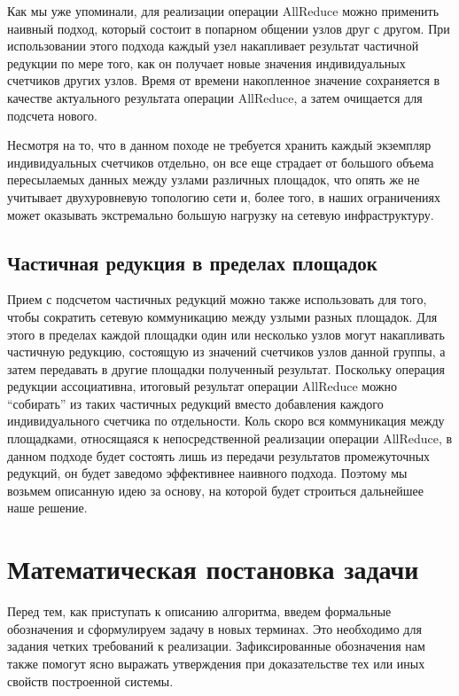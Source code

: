 \documentclass{article}
\theoremstyle{plain}
\theoremstyle{plain}
\theoremstyle{plain}
\theoremstyle{plain}
\theoremstyle{definition}
\theoremstyle{remark}
\theoremstyle{plain}
\begin{document}
Как мы уже упоминали, для реализации операции AllReduce можно применить наивный подход, который состоит в попарном общении узлов друг с другом. При использовании этого подхода каждый узел накапливает результат частичной редукции по мере того, как он получает новые значения индивидуальных счетчиков других узлов. Время от времени накопленное значение сохраняется в качестве актуального результата операции AllReduce, а затем очищается для подсчета нового.

Несмотря на то, что в данном походе не требуется хранить каждый экземпляр индивидуальных счетчиков отдельно, он все еще страдает от большого объема пересылаемых данных между узлами различных площадок, что опять же не учитывает двухуровневую топологию сети и, более того, в наших ограничениях может оказывать экстремально большую нагрузку на сетевую инфраструктуру.

\subsection{Частичная редукция в пределах площадок}
\label{GroupReductionSubsection}

Прием с подсчетом частичных редукций можно также использовать для того, чтобы сократить сетевую коммуникацию между узлыми разных площадок. Для этого в пределах каждой площадки один или несколько узлов могут накапливать частичную редукцию, состоящую из значений счетчиков узлов данной группы, а затем передавать в другие площадки полученный результат. Поскольку операция редукции ассоциативна, итоговый результат операции AllReduce можно \enquote{собирать} из таких частичных редукций вместо добавления каждого индивидуального счетчика по отдельности. Коль скоро вся коммуникация между площадками, относящаяся к непосредственной реализации операции AllReduce, в данном подходе будет состоять лишь из передачи результатов промежуточных редукций, он будет заведомо эффективнее наивного подхода. Поэтому мы возьмем описанную идею за основу, на которой будет строиться дальнейшее наше решение.

\section{Математическая постановка задачи}

Перед тем, как приступать к описанию алгоритма, введем формальные обозначения и сформулируем задачу в новых терминах. Это необходимо для задания четких требований к реализации. Зафиксированные обозначения нам также помогут ясно выражать утверждения при доказательстве тех или иных свойств построенной системы.
\end{document}
